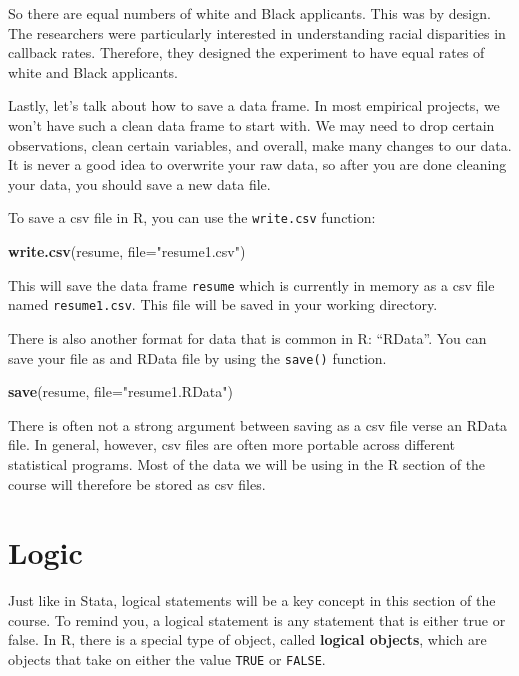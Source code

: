 \documentclass[
]{book}
\newenvironment{Shaded}{\begin{snugshade}}{\end{snugshade}}
\newcommand{\AttributeTok}[1]{\textcolor[rgb]{0.13,0.29,0.53}{#1}}
\newcommand{\FunctionTok}[1]{\textcolor[rgb]{0.13,0.29,0.53}{\textbf{#1}}}
\newcommand{\NormalTok}[1]{#1}
\newcommand{\StringTok}[1]{\textcolor[rgb]{0.31,0.60,0.02}{#1}}
\begin{document}
So there are equal numbers of white and Black applicants. This was by design. The researchers were particularly interested in understanding racial disparities in callback rates. Therefore, they designed the experiment to have equal rates of white and Black applicants.

Lastly, let's talk about how to save a data frame. In most empirical projects, we won't have such a clean data frame to start with. We may need to drop certain observations, clean certain variables, and overall, make many changes to our data. It is never a good idea to overwrite your raw data, so after you are done cleaning your data, you should save a new data file.

To save a csv file in R, you can use the \texttt{write.csv} function:

\begin{Shaded}
\begin{Highlighting}[]
\FunctionTok{write.csv}\NormalTok{(resume, }\AttributeTok{file=}\StringTok{"resume1.csv"}\NormalTok{)}
\end{Highlighting}
\end{Shaded}

This will save the data frame \texttt{resume} which is currently in memory as a csv file named \texttt{resume1.csv}. This file will be saved in your working directory.

There is also another format for data that is common in R: ``RData''. You can save your file as and RData file by using the \texttt{save()} function.

\begin{Shaded}
\begin{Highlighting}[]
\FunctionTok{save}\NormalTok{(resume, }\AttributeTok{file=}\StringTok{"resume1.RData"}\NormalTok{)}
\end{Highlighting}
\end{Shaded}

There is often not a strong argument between saving as a csv file verse an RData file. In general, however, csv files are often more portable across different statistical programs. Most of the data we will be using in the R section of the course will therefore be stored as csv files.

\section{Logic}\label{logic}

Just like in Stata, logical statements will be a key concept in this section of the course. To remind you, a logical statement is any statement that is either true or false. In R, there is a special type of object, called \textbf{logical objects}, which are objects that take on either the value \texttt{TRUE} or \texttt{FALSE}.
\end{document}
